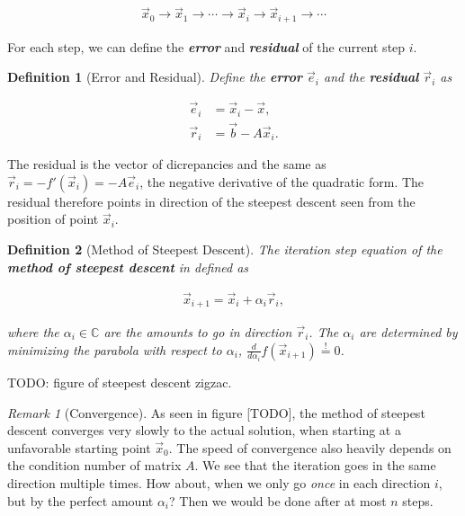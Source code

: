 \documentclass{article}
\theoremstyle{plain} %
\newtheorem{definition}{Definition}[section]
\theoremstyle{remark} %
\newtheorem*{remark}{Remark} %
\def\df#1{\textbf{\textit{#1}}}
\numberwithin{equation}{section}
\begin{document}
\begin{align*}
    \vec{x}_0 \longrightarrow \vec{x}_1 \longrightarrow \dotsb \longrightarrow \vec{x}_i \longrightarrow \vec{x}_{i+1} \longrightarrow \dotsb
\end{align*}

For each step, we can define the \df{error} and \df{residual} of the current step $i$.

\begin{definition}[Error and Residual]

Define the \df{error} $\vec{e}_i$ and the \df{residual} $\vec{r}_i$ as

\begin{subequations}
    \begin{align}
        \vec{e}_i &= \vec{x}_i - \vec{x}, \label{eq:error} \\
        \vec{r}_i &= \vec{b} - A \vec{x}_i. \label{eq:residual}
    \end{align}
\end{subequations}

\end{definition}

The residual is the vector of dicrepancies and the same as $\vec{r}_i = -f'(\vec{x}_i) = -A \vec{e}_i$, the negative derivative of the quadratic form. The residual therefore points in direction of the steepest descent seen from the position of point $\vec{x}_i$.

\begin{definition}[Method of Steepest Descent]
The iteration step equation of the \df{method of steepest descent} in defined as

\begin{align*}
    \vec{x}_{i+1} = \vec{x}_i + \alpha_i \vec{r}_i,
\end{align*}

where the $\alpha_i \in \mathbb{C}$ are the amounts to go in direction $\vec{r}_i$. The $\alpha_i$ are determined by minimizing the parabola with respect to $\alpha_i$, $\frac{d}{d \alpha_i} f(\vec{x}_{i+1}) \stackrel{!}{=} 0$.

\end{definition}

TODO: figure of steepest descent zigzac.

\begin{remark}[Convergence]
As seen in figure [TODO], the method of steepest descent converges very slowly to the actual solution, when starting at a unfavorable starting point $\vec{x}_0$. The speed of convergence also heavily depends on the condition number of matrix $A$. We see that the iteration goes in the same direction multiple times. How about, when we only go \textit{once} in each direction $i$, but by the perfect amount $\alpha_i$? Then we would be done after at most $n$ steps.
\end{remark}
\end{document}
